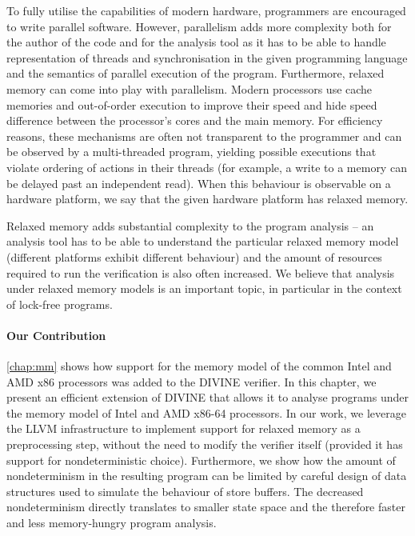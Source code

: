 To fully utilise the capabilities of modern hardware, programmers are encouraged to write parallel software.
However, parallelism adds more complexity both for the author of the code and for the analysis tool as it has to be able to handle representation of threads and synchronisation in the given programming language and the semantics of parallel execution of the program.
Furthermore, relaxed memory can come into play with parallelism.
Modern processors use cache memories and out-of-order execution to improve their speed and hide speed difference between the processor's cores and the main memory.
For efficiency reasons, these mechanisms are often not transparent to the programmer and can be observed by a multi-threaded program, yielding possible executions that violate ordering of actions in their threads (for example, a write to a memory can be delayed past an independent read).
When this behaviour is observable on a hardware platform, we say that the given hardware platform has relaxed memory.

Relaxed memory adds substantial complexity to the program analysis --
an analysis tool has to be able to understand the particular relaxed memory model (different platforms exhibit different behaviour) and the amount of resources required to run the verification is also often increased.
We believe that analysis under relaxed memory models is an important topic,
in particular in the context of lock-free programs.

\paragraph{Our Contribution}

\autoref{chap:mm} shows how support for the memory model of the common Intel and AMD x86 processors was added to the DIVINE verifier.
In this chapter, we present an efficient extension of DIVINE that allows it to
analyse programs under the memory model of Intel and AMD x86-64 processors.
In our work, we leverage the LLVM infrastructure to implement support for
relaxed memory as a preprocessing step, without the need to modify the verifier
itself (provided it has support for nondeterministic choice).
Furthermore, we show how the amount of nondeterminism in the resulting program
can be limited by careful design of data structures used to simulate the
behaviour of \xtso store buffers.
The decreased nondeterminism directly translates to smaller state space and the therefore faster and less memory-hungry program analysis.

